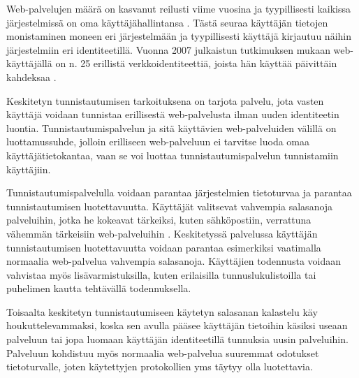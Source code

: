 Web-palvelujen määrä on kasvanut reilusti viime vuosina ja tyypillisesti kaikissa järjestelmissä on oma käyttäjähallintansa \cite{billion_keys}. Tästä seuraa käyttäjän tietojen monistaminen moneen eri järjestelmään ja tyypillisesti käyttäjä kirjautuu näihin järjestelmiin eri identiteetillä. Vuonna 2007 julkaistun tutkimuksen mukaan web-käyttäjällä on n. 25 erillistä verkkoidentiteettiä, joista hän käyttää päivittäin kahdeksaa \cite{password_habits}.

Keskitetyn tunnistautumisen tarkoituksena on tarjota palvelu, jota vasten käyttäjä voidaan tunnistaa erillisestä web-palvelusta ilman uuden identiteetin luontia. Tunnistautumispalvelun ja sitä käyttävien web-palveluiden välillä on luottamussuhde, jolloin erilliseen web-palveluun ei tarvitse luoda omaa käyttäjätietokantaa, vaan se voi luottaa tunnistautumispalvelun tunnistamiin käyttäjiin.

Tunnistautumispalvelulla voidaan parantaa järjestelmien tietoturvaa ja parantaa tunnistautumisen luotettavuutta. Käyttäjät valitsevat vahvempia salasanoja palveluihin, jotka he kokeavat tärkeiksi, kuten sähköpostiin, verrattuna vähemmän tärkeisiin web-palveluihin \cite{password_habits}. Keskitetyssä palvelussa käyttäjän tunnistautumisen luotettavuutta voidaan parantaa esimerkiksi vaatimalla normaalia web-palvelua vahvempia salasanoja. Käyttäjien todennusta voidaan vahvistaa myös lisävarmistuksilla, kuten erilaisilla tunnuslukulistoilla tai puhelimen kautta tehtävällä todennuksella.

Toisaalta keskitetyn tunnistautumiseen käytetyn salasanan kalastelu käy houkuttelevammaksi, koska sen avulla pääsee käyttäjän tietoihin käsiksi useaan palveluun tai jopa luomaan käyttäjän identiteetillä tunnuksia uusin palveluihin. Palveluun kohdistuu myös normaalia web-palvelua suuremmat odotukset tietoturvalle, joten käytettyjen protokollien yms täytyy olla luotettavia.